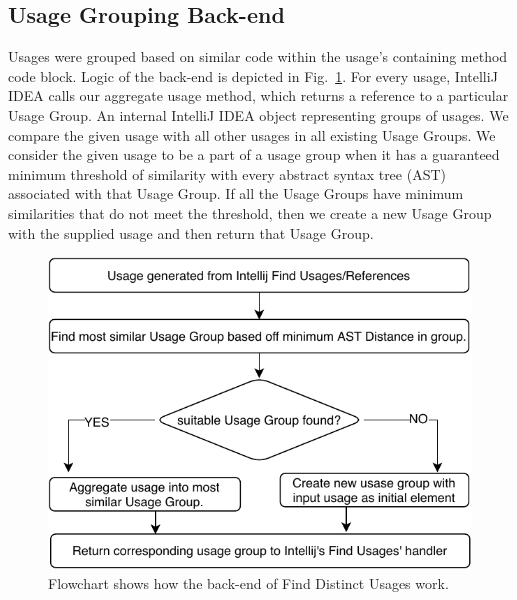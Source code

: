 \documentclass[conference]{IEEEtran}
\begin{document}
\subsection{Usage Grouping Back-end} 
Usages were grouped based on similar code within the usage's containing method code block. Logic of the back-end is depicted in Fig.~\ref{fig:flowchart}. For every usage, IntelliJ IDEA calls our aggregate usage method, which returns a reference to a particular Usage Group. An internal IntelliJ IDEA object representing groups of usages. We compare the given usage with all other usages in all existing Usage Groups. We consider the given usage to be a part of a usage group when it has a guaranteed minimum threshold of similarity with every abstract syntax tree (AST)  associated with that Usage Group. If all the Usage Groups have minimum similarities that do not meet the threshold, then we create a new Usage Group with the supplied usage and then return that Usage Group. \par
\begin{figure}[H]
    \centering
    \includegraphics [width=\columnwidth,keepaspectratio, clip]{figures/flowchart}
    \caption{Flowchart shows how the back-end of Find Distinct Usages work. }
\label{fig:flowchart}
\end{figure}
\end{document}
